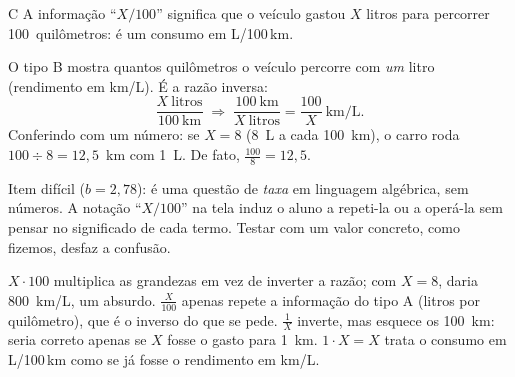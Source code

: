 \begin{resolucao}{C}
 A informação ``$X/100$'' significa que o
veículo gastou $X$ litros para percorrer 100~quilômetros: é um consumo em L/100\,km.

 O tipo B mostra quantos quilômetros o veículo
percorre com \emph{um} litro (rendimento em km/L). É a razão inversa:
\[
\frac{X~\text{litros}}{100~\text{km}} \;\Longrightarrow\; \frac{100~\text{km}}{X~\text{litros}} = \frac{100}{X}~\text{km/L}.
\]
Conferindo com um número: se $X = 8$ (8~L a cada 100~km), o carro roda
$100 \div 8 = 12{,}5$~km com 1~L. De fato, $\frac{100}{8} = 12{,}5$.

 Item difícil ($b = 2{,}78$): é uma questão de
\emph{taxa} em linguagem algébrica, sem números. A notação ``$X/100$'' na tela
induz o aluno a repeti-la ou a operá-la sem pensar no significado de cada termo.
Testar com um valor concreto, como fizemos, desfaz a confusão.
\begin{distratores}
 $X \cdot 100$ multiplica as grandezas em vez de inverter a razão; com $X = 8$,
daria 800~km/L, um absurdo.
 $\frac{X}{100}$ apenas repete a informação do tipo A (litros por quilômetro),
que é o inverso do que se pede.
 $\frac{1}{X}$ inverte, mas esquece os 100~km: seria correto apenas se $X$ fosse o
gasto para 1~km.
 $1 \cdot X = X$ trata o consumo em L/100\,km como se já fosse o rendimento em km/L.
\end{distratores}
\end{resolucao}

